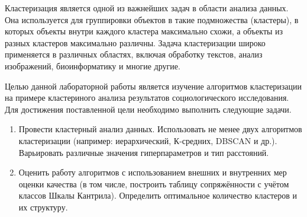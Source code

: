 
Кластеризация является одной из важнейших задач в области анализа данных. Она используется для группировки объектов в такие подмножества (кластеры), в которых объекты
внутри каждого кластера максимально схожи, а объекты из разных кластеров максимально различны. Задача кластеризации широко применяется в различных областях, включая обработку
текстов, анализ изображений, биоинформатику и многие другие.

Целью данной лабораторной работы является изучение алгоритмов кластеризации на примере кластериного анализа результатов социологического исследования. Для достижения поставленной цели необходимо выполнить следующие задачи.
\begin{enumerate}[label*=\arabic*.]
	\item Провести кластерный анализ данных. Использовать не менее двух алгоритмов кластеризации (например: иерархический, К-средних, DBSCAN и др.). Варьировать различные значения гиперпараметров и тип расстояний.
	\item  Оценить работу алгоритмов с использованием внешних и внутренних мер оценки качества (в том числе, построить таблицу сопряжённости с учётом классов Шкалы Кантрила). Определить оптимальное количество кластеров и их структуру.
\end{enumerate}

\clearpage
